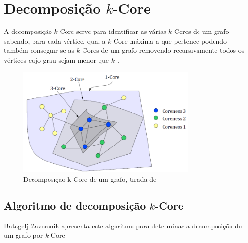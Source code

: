 \renewcommand{\algorithmicrequire}{\textbf{Dados: }}
\renewcommand{\algorithmicensure}{\textbf{Resultado: }}

\section{Decomposição \texorpdfstring{$k$}{k}-Core}
A decomposição $k$-Core serve para identificar as várias $k$-Cores de um grafo sabendo, para cada vértice, qual a $k$-Core máxima a que pertence podendo também conseguir-se as $k$-Cores de um grafo removendo recursivamente todos os vértices cujo grau sejam menor que $k$~\cite{kCoreDef}.
%


\begin{figure}
\centering
\caption{Decomposição k-Core de um grafo, tirada de~\cite{kCoreDis}}
\includegraphics[width=90mm]{kCoreExample}
\end{figure}

\subsection{Algoritmo de decomposição \texorpdfstring{$k$}{k}-Core}
Batagelj-Zaversnik apresenta\cite{kCoreCen1,kCoreCen2} este algoritmo para determinar a decomposição de um grafo por $k$-Core:

